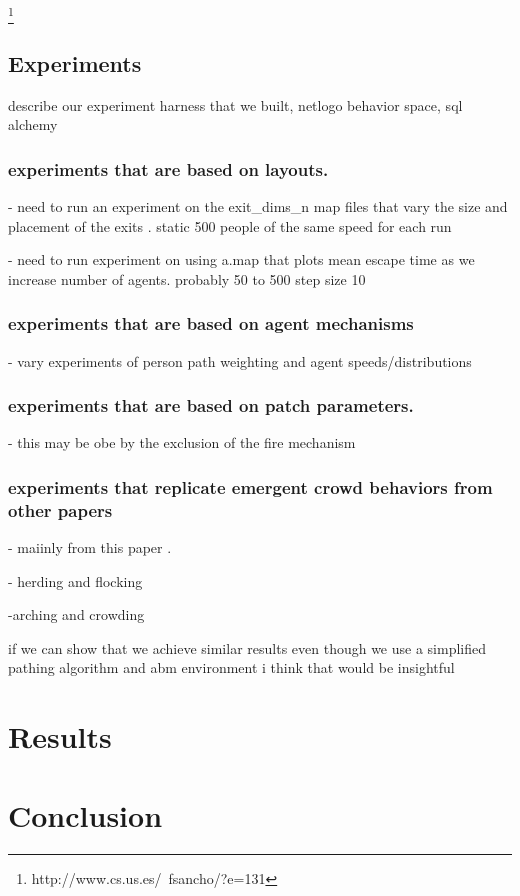 \documentclass[12pt,letterpaper]{article}
\begin{document}
\cite{mirahmadiNovelAlgorithmRealtime2012}
\footnote{http://www.cs.us.es/~fsancho/?e=131}

\subsection{Experiments}

describe our experiment harness that we built, netlogo behavior space, sql alchemy

\subsubsection{experiments that are based on layouts.}  

- need to run an experiment on the exit\_dims\_n map files that vary the size and placement of the exits . static 500 people of the same speed for each run

- need to run experiment on using a.map that plots mean escape time as we increase number of agents.  probably 50 to 500 step size 10

\subsubsection{experiments that are based on agent mechanisms}

- vary experiments of person path weighting and agent speeds/distributions

\subsubsection{experiments that are based on patch parameters.}

-  this may be obe by the exclusion of the fire mechanism

\subsubsection{experiments that replicate emergent crowd behaviors from other papers}
- maiinly from this paper \cite{almeidaCrowdSimulationModeling2013}  .  

- herding and flocking

-arching and crowding

if we can show that we achieve similar results even though we use a simplified pathing algorithm and abm environment i think that would be insightful


\section{Results}



\section {Conclusion}



\end{document}
